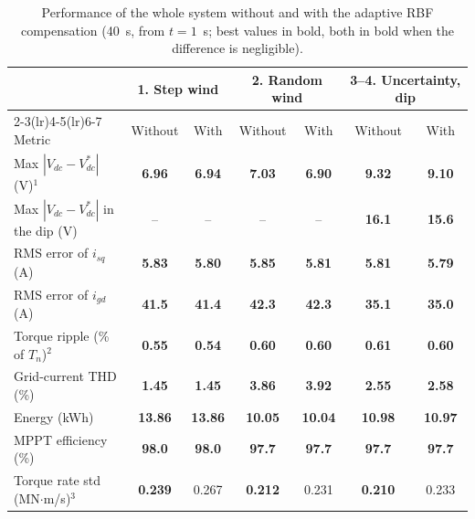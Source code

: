 \documentclass[11pt,a4paper]{article}
\begin{document}
\begin{table}[!htb]
\caption{Performance of the whole system without and with the adaptive RBF compensation (40~s, from
$t=1$~s; best values in bold, both in bold when the difference is negligible).}
\label{tab:sys}
\centering
\footnotesize
\setlength{\tabcolsep}{4pt}
\begin{tabular}{lcccccc}
\toprule
 & \multicolumn{2}{c}{1. Step wind} & \multicolumn{2}{c}{2. Random wind} & \multicolumn{2}{c}{3--4. Uncertainty, dip}\\
\cmidrule(lr){2-3}\cmidrule(lr){4-5}\cmidrule(lr){6-7}
Metric & Without & With & Without & With & Without & With\\
\midrule
Max $|V_{dc}-V_{dc}^*|$ (V)$^{1}$ & \textbf{6.96} & \textbf{6.94} & \textbf{7.03} & \textbf{6.90} & \textbf{9.32} & \textbf{9.10}\\
Max $|V_{dc}-V_{dc}^*|$ in the dip (V) & -- & -- & -- & -- & \textbf{16.1} & \textbf{15.6}\\
RMS error of $i_{sq}$ (A) & \textbf{5.83} & \textbf{5.80} & \textbf{5.85} & \textbf{5.81} & \textbf{5.81} & \textbf{5.79}\\
RMS error of $i_{gd}$ (A) & \textbf{41.5} & \textbf{41.4} & \textbf{42.3} & \textbf{42.3} & \textbf{35.1} & \textbf{35.0}\\
Torque ripple (\% of $T_n$)$^{2}$ & \textbf{0.55} & \textbf{0.54} & \textbf{0.60} & \textbf{0.60} & \textbf{0.61} & \textbf{0.60}\\
Grid-current THD (\%) & \textbf{1.45} & \textbf{1.45} & \textbf{3.86} & \textbf{3.92} & \textbf{2.55} & \textbf{2.58}\\
Energy (kWh) & \textbf{13.86} & \textbf{13.86} & \textbf{10.05} & \textbf{10.04} & \textbf{10.98} & \textbf{10.97}\\
MPPT efficiency (\%) & \textbf{98.0} & \textbf{98.0} & \textbf{97.7} & \textbf{97.7} & \textbf{97.7} & \textbf{97.7}\\
Torque rate std (MN$\cdot$m/s)$^{3}$ & \textbf{0.239} & 0.267 & \textbf{0.212} & 0.231 & \textbf{0.210} & 0.233\\
\bottomrule
\end{tabular}

\end{table}

\end{document}
